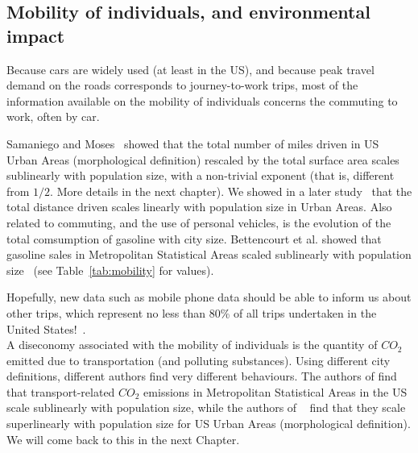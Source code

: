 \subsection{Mobility of individuals, and environmental impact}
\label{sub:mobility}

Because cars are widely used (at least in the US), and because peak travel
demand on the roads corresponds to journey-to-work trips, most of the
information available on the mobility of individuals concerns the commuting to
work, often by car. 

Samaniego and Moses~\cite{Samaniego:2008} showed that the total number of miles
driven in US Urban Areas (morphological definition) rescaled by the total
surface area scales sublinearly with population size, with a non-trivial
exponent (that is, different from $1/2$. More details in the next chapter). We
showed in a later study~\cite{Louf:2014_scaling} that the total distance driven
scales linearly with population size in Urban Areas.
Also related to commuting, and the use of personal vehicles, is the
evolution of the total comsumption of gasoline with city size.
Bettencourt et al. showed that gasoline sales in Metropolitan Statistical Areas
scaled sublinearly with population size~\cite{Bettencourt:2007} (see
Table~\ref{tab:mobility} for values). 

Hopefully, new data such as mobile phone data should be
able to inform us about other trips, which represent no less than 80\% of all
trips undertaken in the United States!~\cite{FHWA-PL-11-022}.\\

A diseconomy associated with the mobility of individuals is the
quantity of $CO_2$ emitted due to transportation (and polluting substances).
Using different city definitions, different authors find very different
behaviours. The authors of \cite{Fragkias:2013} find that transport-related
$CO_2$ emissions in Metropolitan Statistical Areas in the US scale sublinearly
with population size, while the authors of
~\cite{Louf:2014_mobility,Oliveira:2014} find that they scale superlinearly with
population size for US Urban Areas (morphological definition). We will come back
to this in the next Chapter.

